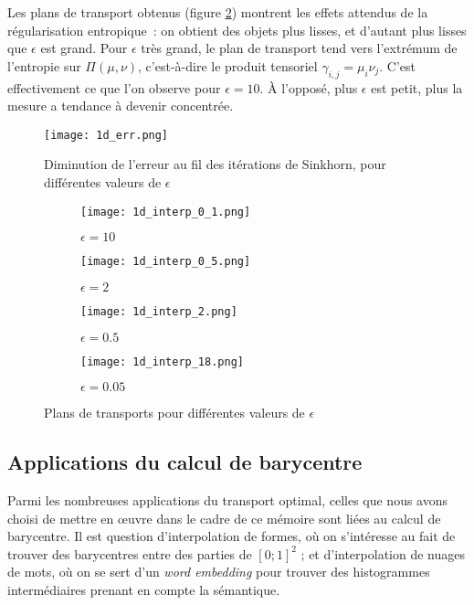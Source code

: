 Les plans de transport obtenus (figure \ref{fig:1d_maps}) montrent les effets attendus de la régularisation entropique~: on obtient des objets plus lisses, et d'autant plus lisses que $\epsilon$ est grand. Pour $\epsilon$ très grand, le plan de transport tend vers l'extrémum de l'entropie sur $\Pi(\mu,\nu)$, c'est-à-dire le produit tensoriel $\gamma_{i,j} = \mu_i \nu_j$. C'est effectivement ce que l'on observe pour $\epsilon=10$. À l'opposé, plus $\epsilon$ est petit, plus la mesure a tendance à devenir concentrée.

\begin{figure}
\centering
\texttt{[image: 1d\_err.png]}
\caption{Diminution de l'erreur au fil des itérations de Sinkhorn, pour différentes valeurs de $\epsilon$}
\label{fig:1d_cv}
\end{figure}

\begin{figure}
\centering
\begin{subfigure}[b]{5cm}
\texttt{[image: 1d\_interp\_0\_1.png]}
\caption{$\epsilon=10$}
\end{subfigure}
%
\begin{subfigure}[b]{5cm}
\texttt{[image: 1d\_interp\_0\_5.png]}
\caption{$\epsilon=2$}
\end{subfigure}
%
\begin{subfigure}[b]{5cm}
\texttt{[image: 1d\_interp\_2.png]}
\caption{$\epsilon=0.5$}
\end{subfigure}
%
\begin{subfigure}[b]{5cm}
\texttt{[image: 1d\_interp\_18.png]}
\caption{$\epsilon=0.05$}
\end{subfigure}
%
\caption{Plans de transports pour différentes valeurs de $\epsilon$}
\label{fig:1d_maps}
\end{figure}

\subsection{Applications du calcul de barycentre}

Parmi les nombreuses applications du transport optimal, celles que nous avons choisi de mettre en \oe uvre dans le cadre de ce mémoire sont liées au calcul de barycentre. Il est question d'interpolation de formes, où on s'intéresse au fait de trouver des barycentres entre des parties de $[0;1]^2$ ; et d'interpolation de nuages de mots, où on se sert d'un \emph{word embedding} \cite{mikolov13} pour trouver des histogrammes intermédiaires prenant en compte la sémantique.

